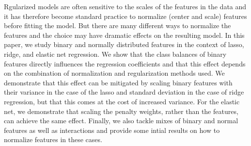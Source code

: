 Rgularized models are often sensitive to the scales of the features in the data and it has
therefore become standard practice to normalize (center and scale) features before fitting
the model. But there are many different ways to normalize the features and the choice may
have dramatic effects on the resulting model. In this paper, we study binary and normally
distributed features in the context of lasso, ridge, and elastic net regression. We show
that the class balances of binary features directly influences the regression coefficients
and that this effect depends on the combination of normalization and regularization methods
used. We demonstrate that this effect can be mitigated by scaling binary features with
their variance in the case of the lasso and standard deviation in the case of ridge
regression, but that this comes at the cost of increased variance. For the elastic net, we
demonstrate that scaling the penalty weights, rather than the features, can achieve the
same effect. Finally, we also tackle mixes of binary and normal features as well as
interactions and provide some intial results on how to normalize features in these cases.
